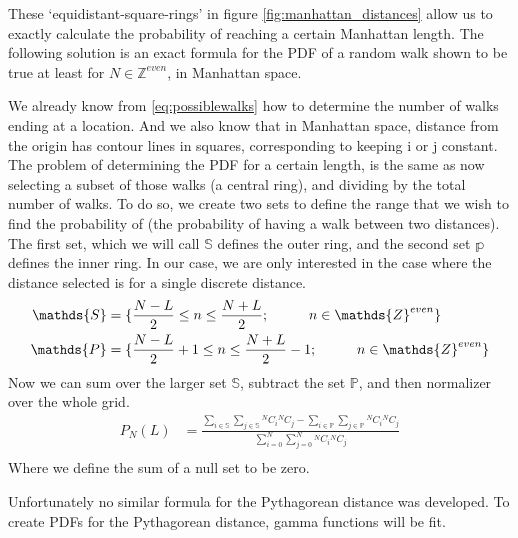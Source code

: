  	These `equidistant-square-rings' in figure \ref{fig:manhattan_distances} allow us to exactly calculate the probability of reaching a certain Manhattan length. The following solution is an exact formula for the PDF of a random walk shown to be true at least for $N\in \mathds{Z}^{even}$, in Manhattan space. 
 	

 	We already know from \ref{eq:possiblewalks} how to determine the number of walks ending at a location. And we also know that in Manhattan space, distance from the origin has contour lines in squares, corresponding to keeping i or j constant.  The problem of determining the PDF for a certain length, is the same as now selecting a subset of those walks (a central ring), and dividing by the total number of walks. 
 	To do so, we create two sets to define the range that we wish to find the probability of (the probability of having a walk between two distances). 
 	The first set, which we will call $\mathds{S}$ defines the outer ring, and the second set $\mathds{p}$ defines the inner ring. In our case, we are only interested in the case where the distance selected is for a single discrete distance.
 	\begin{align}
 	 	\centering
 	 		\mathds{S} &= \{ \frac{N-L}{2} \leq n \leq \frac{N+L}{2};  \hspace{1cm} n\in \mathds{Z}^{even} \}\\
 	 		\mathds{P} &= \{\frac{N-L}{2}+1 \leq n \leq \frac{N+L}{2}-1;  \hspace{1cm} n\in \mathds{Z}^{even}\}
 	 	\end{align}
	Now we can sum over the larger set $\mathds{S}$, subtract the set $\mathds{P}$, and then normalizer over the whole grid.
 	\begin{align}
 	P_N(L) & = \frac{\sum_{i\in \mathds{S}}\sum_{j\in \mathds{S}} {}^NC_i {}^NC_j - \sum_{i\in \mathds{P}}\sum_{j\in \mathds{P}} {}^NC_i {}^NC_j}
 	{\sum_{i = 0}^N\sum_{j=0}^N {}^NC_i {}^NC_j }\\
 	\label{eq:exactPDF}
 	\end{align}
	Where we define the sum of a null set to be zero. 
 	
 	Unfortunately no similar formula for the Pythagorean distance was developed. To create PDFs for the Pythagorean distance, gamma functions will be fit.

 	
 	
 	
 	
 	
